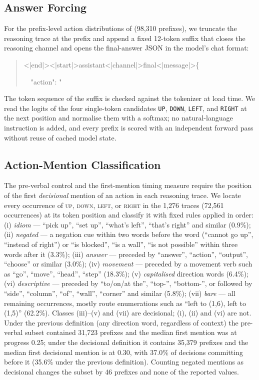 \documentclass{article}
\begin{document}
\subsection{Answer Forcing}
\label{app:answer-forcing}
For the prefix-level action distributions of  (98,310 prefixes), we truncate the reasoning trace at the prefix and append a fixed 12-token suffix that closes the reasoning channel and opens the final-answer JSON in the model's chat format:
\begin{quote}
\ttfamily
<|end|><|start|>assistant<|channel|>final<|message|>\{\par
\ \ "action": "
\end{quote}
The token sequence of the suffix is checked against the tokenizer at load time.
We read the logits of the four single-token candidates \texttt{UP}, \texttt{DOWN}, \texttt{LEFT}, and \texttt{RIGHT} at the next position and normalise them with a softmax; no natural-language instruction is added, and every prefix is scored with an independent forward pass without reuse of cached model state.

\subsection{Action-Mention Classification}
\label{app:action-mentions}
The pre-verbal control and the first-mention timing measure require the position of the first \emph{decisional} mention of an action in each reasoning trace.
We locate every occurrence of \textsc{up}, \textsc{down}, \textsc{left}, or \textsc{right} in the 1,276 traces (72,561 occurrences) at its token position and classify it with fixed rules applied in order: (i) \emph{idiom} --- ``pick up'', ``set up'', ``what's left'', ``that's right'' and similar (0.9\%); (ii) \emph{negated} --- a negation cue within two words before the word (``cannot go up'', ``instead of right'') or ``is blocked'', ``is a wall'', ``is not possible'' within three words after it (3.3\%); (iii) \emph{answer} --- preceded by ``answer'', ``action'', ``output'', ``choose'' or similar (3.0\%); (iv) \emph{movement} --- preceded by a movement verb such as ``go'', ``move'', ``head'', ``step'' (18.3\%); (v) \emph{capitalised} direction words (6.4\%); (vi) \emph{descriptive} --- preceded by ``to/on/at the'', ``top-'', ``bottom-'', or followed by ``side'', ``column'', ``of'', ``wall'', ``corner'' and similar (5.8\%); (vii) \emph{bare} --- all remaining occurrences, mostly route enumerations such as ``left to (1,6), left to (1,5)'' (62.2\%).
Classes (iii)--(v) and (vii) are decisional; (i), (ii) and (vi) are not.
Under the previous definition (any direction word, regardless of context) the pre-verbal subset contained 31,723 prefixes and the median first mention was at progress 0.25; under the decisional definition it contains 35,379 prefixes and the median first decisional mention is at 0.30, with 37.0\% of decisions committing before it (35.6\% under the previous definition).
Counting negated mentions as decisional changes the subset by 46 prefixes and none of the reported values.
\end{document}
